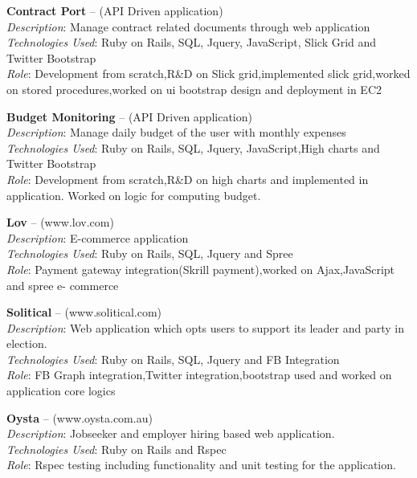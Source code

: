 \documentclass[11pt,a4paper]{moderncv}
\begin{document}
\cvlistitem
{\textbf{Contract Port} -- {\small (API Driven application)} 
  \\\textit{Description}: Manage contract related documents through web application\\
    \textit{Technologies Used}: Ruby on Rails, SQL, Jquery, JavaScript, Slick Grid and Twitter Bootstrap \\
    \textit{Role}: Development from scratch,R\&D on Slick grid,implemented slick grid,worked on stored procedures,worked on ui bootstrap design and deployment in EC2\\
}

\cvlistitem
{\textbf{Budget Monitoring}  -- {\small (API Driven application)} 
  \\\textit{Description}: Manage daily budget of the user with monthly expenses \\
    \textit{Technologies Used}: Ruby on Rails, SQL, Jquery, JavaScript,High charts and Twitter Bootstrap\\
    \textit{Role}: Development from scratch,R\&D on high charts and implemented in application. Worked on logic for computing budget.\\
}

\cvlistitem
{\textbf{Lov} -- {\small (www.lov.com)} 
  \\\textit{Description}: E-commerce application\\
    \textit{Technologies Used}: Ruby on Rails, SQL, Jquery and Spree \\
    \textit{Role}: Payment gateway integration(Skrill payment),worked on Ajax,JavaScript and spree e- commerce\\
}

\cvlistitem
{\textbf{Solitical} -- {\small (www.solitical.com)} 
  \\\textit{Description}: Web application which opts users to support its leader and party in election.\\
    \textit{Technologies Used}: Ruby on Rails, SQL, Jquery and FB Integration \\
    \textit{Role}: FB Graph integration,Twitter integration,bootstrap used and worked on application core logics\\
}

\cvlistitem
{\textbf{Oysta} -- {\small (www.oysta.com.au)} 
  \\\textit{Description}: Jobseeker and employer hiring based web application.\\
    \textit{Technologies Used}: Ruby on Rails and Rspec\\
    \textit{Role}: Rspec testing including functionality and unit testing for the application.\\
}
\end{document}
